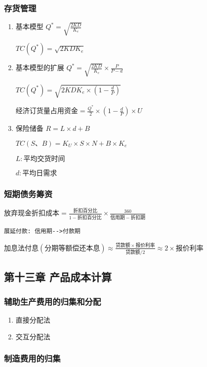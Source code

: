 \documentclass[12pt,a4paper]{article}
\begin{document}
\subsubsection{存货管理}
\label{sec:org5cf956f}
\begin{enumerate}
\item 基本模型
\label{sec:org16ea40b}
\(Q^{*}=\sqrt{\frac{2KD}{K_{e}}}\)

\(TC(Q^{*})=\sqrt{2KDK_{e}}\)
\item 基本模型的扩展
\label{sec:org1d757d0}
\(Q^{*}=\sqrt{\frac{2KD}{K_{e}}}\times \frac{P}{P-d}\)

\(TC(Q^{*})=\sqrt{2KDK_{e}\times (1-\frac{d}{P})}\)

\(经济订货量占用资金=\frac{Q^{*}}{2}\times (1-\frac{d}{P})\times U\)
\item 保险储备
\label{sec:org18e599c}
\(R=L\times d +B\)

\(TC(S、B)=K_U\times S\times N+B\times K_{e}\)

\(L:平均交货时间\)

\(d:平均日需求\)
\end{enumerate}
\subsubsection{短期债务筹资}
\label{sec:org1b6a672}
\(放弃现金折扣成本 =\frac{折扣百分比}{1-折扣百分比}\times \frac{360}{信用期-折扣期}\)
\begin{verbatim}
展延付款: 信用期-->付款期
\end{verbatim}
\(加息法付息(分期等额偿还本息)\approx \frac{贷款额\times 报价利率}{贷款额/2}\approx2\times 报价利率\)

\subsection{第十三章 产品成本计算}
\label{sec:orgc6b7fcf}
\subsubsection{辅助生产费用的归集和分配}
\label{sec:org3e55b46}
\begin{enumerate}
\item 直接分配法
\label{sec:org01f84e1}
\item 交互分配法
\label{sec:org034dff5}
\end{enumerate}
\subsubsection{制造费用的归集}
\label{sec:orgeacaae9}
\end{document}
